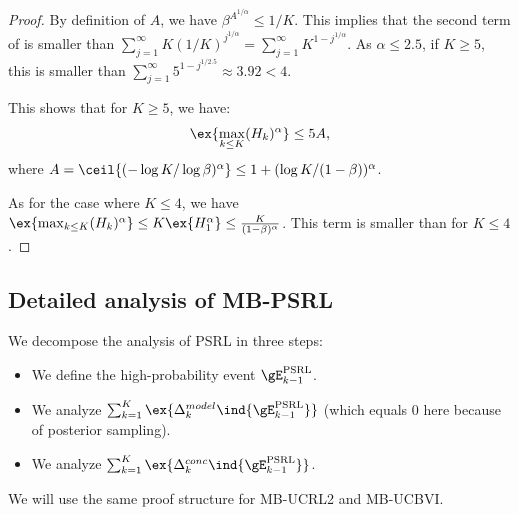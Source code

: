 \begin{subappendices}
\begin{proof}
    By definition of $A$, we have $\beta^{A^{1/\alpha}}\le 1/K$. This implies that the second term of  is smaller than $\sum_{j=1}^\infty K (1/K)^{j^{1/\alpha}}=\sum_{j=1}^\infty K^{1-j^{1/\alpha}}$. As $\alpha\le 2.5$, if  $K\ge5$, this is smaller than $\sum_{j=1}^\infty 5^{1-j^{1/2.5}}\approx 3.92<4$.
 
    This shows that for $K\ge5$, we have:
    \begin{align*}
        \ex{\max_{k\le K}(H_k)^\alpha} \le 5A,
    \end{align*}
    where $A=\ceil{(-\log K/\log \beta)^{\alpha}}\le 1+(\log K/(1-\beta ))^\alpha$.
 
    As for the case where $K\le4$, we have $\ex{\max_{k\le K}(H_k)^\alpha}\le K\ex{H_1^\alpha}\le \frac{K}{(1-\beta)^{\alpha}}$. This term is smaller than  for $K\le4$.
 \end{proof}


\subsection{Detailed analysis of MB-PSRL}
\label{ssec:proof_PSRL}

We decompose the analysis of PSRL in three steps: 
\begin{itemize}
    \item We define the high-probability event $\gE^\text{PSRL}_{k-1}$.
    \item We analyze $\sum_{k=1}^K\ex{\Delta^{model}_k \ind{\gE^\text{PSRL}_{k-1}}}$ (which equals $0$ here because of posterior sampling).
    \item We analyze $\sum_{k=1}^K\ex{\Delta^{conc}_k \ind{\gE^\text{PSRL}_{k-1}}}$. 
\end{itemize}
We will use the same proof structure for MB-UCRL2 and MB-UCBVI. 


\end{subappendices}
